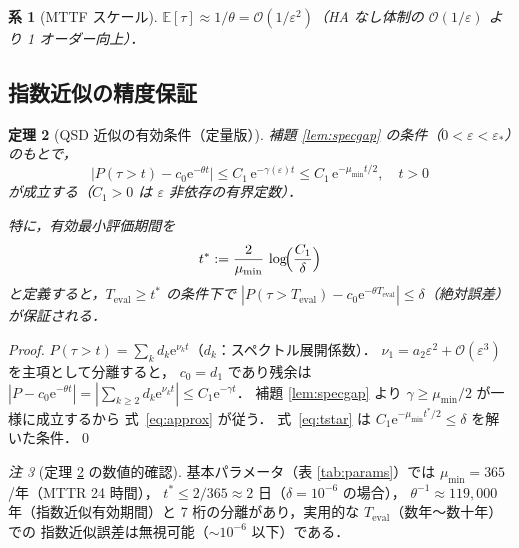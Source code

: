 \documentclass[12pt,a4paper]{article}
\theoremstyle{plain}
\newtheorem{theorem}{定理}[section]
\newtheorem{corollary}[theorem]{系}
\theoremstyle{definition}
\theoremstyle{remark}
\newtheorem{remark}[theorem]{注}
\newcommand{\bE}{\mathbb{E}}
\newcommand{\calO}{\mathcal{O}}
\newcommand{\eps}{\varepsilon}
\newcommand{\e}{\mathrm{e}}
\newcommand{\Teval}{T_{\mathrm{eval}}}
\begin{document}
\begin{corollary}[MTTF スケール]\label{cor:mttf}
  $\bE[\tau]\approx1/\theta=\calO(1/\eps^2)$（HA なし体制の $\calO(1/\eps)$ より 1 オーダー向上）．
\end{corollary}

\subsection{指数近似の精度保証}

\begin{theorem}[QSD 近似の有効条件（定量版）]\label{thm:QSD_bound}
  補題 \ref{lem:specgap} の条件（$0<\eps<\eps_*$）のもとで，
  \begin{equation}\label{eq:approx}
    \bigl|P(\tau>t) - c_0\e^{-\theta t}\bigr|
    \le C_1\,\e^{-\gamma(\eps)t}
    \le C_1\,\e^{-\mu_{\min}t/2},\quad t>0
  \end{equation}
  が成立する（$C_1>0$ は $\eps$ 非依存の有界定数）．

  特に，有効最小評価期間を
  \begin{equation}\label{eq:tstar}
    t^* := \frac{2}{\mu_{\min}}\,\log\!\Bigl(\frac{C_1}{\delta}\Bigr)
  \end{equation}
  と定義すると，$\Teval \ge t^*$ の条件下で
  $|P(\tau>\Teval)-c_0\e^{-\theta\Teval}|\le\delta$（絶対誤差）が保証される．
\end{theorem}

\begin{proof}
  $P(\tau>t) = \sum_k d_k\e^{\nu_k t}$（$d_k$：スペクトル展開係数）．
  $\nu_1=a_2\eps^2+\calO(\eps^3)$ を主項として分離すると，
  $c_0=d_1$ であり残余は $|P-c_0\e^{-\theta t}|=|\sum_{k\ge2}d_k\e^{\nu_k t}|\le C_1\e^{-\gamma t}$．
  補題 \ref{lem:specgap} より $\gamma\ge\mu_{\min}/2$ が一様に成立するから
  式~\eqref{eq:approx} が従う．
  式~\eqref{eq:tstar} は $C_1\e^{-\mu_{\min}t^*/2}\le\delta$ を解いた条件．\qed
\end{proof}

\begin{remark}[定理 \ref{thm:QSD_bound} の数値的確認]
  基本パラメータ（表 \ref{tab:params}）では
  $\mu_{\min}=365$ /年（MTTR 24 時間），
  $t^*\le 2/365\approx 2$ 日（$\delta=10^{-6}$ の場合），
  $\theta^{-1}\approx 119{,}000$ 年（指数近似有効期間）と
  7 桁の分離があり，実用的な $\Teval$（数年〜数十年）での
  指数近似誤差は無視可能（$\sim 10^{-6}$ 以下）である．
\end{remark}

\end{document}
